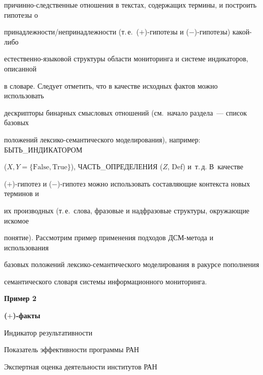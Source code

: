 причинно-следственные отношения в текстах, содержащих термины, и построить гипотезы о 


принадлежности/непринадлежности (т.\,е.\ ($+$)-ги\-по\-те\-зы и ($-$)-ги\-по\-те\-зы) ка\-кой-ли\-бо 


естественно-языковой структуры области мониторинга и системе индикаторов, описанной 


в словаре. Следует отметить, что в качестве исходных фактов можно использовать 


дескрипторы бинарных смысловых отношений (см.\ начало раздела~--- список базовых 


положений лек\-си\-ко-се\-ман\-ти\-че\-ско\-го моделирования), например: БЫТЬ\_ИНДИКАТОРОМ 


($X, Y=\mathrm{\{False, True\}}$), ЧАСТЬ\_ОПРЕДЕЛЕНИЯ ($Z$, Def) и~т.\,д. В~качестве 


($+$)-ги\-по\-тез и ($-$)-ги\-по\-тез можно использовать составляющие контекста новых терминов и 


их производных (т.\,е.\ слова, фразовые и надфразовые структуры, окружающие искомое 


понятие). Рассмотрим пример применения подходов ДСМ-ме\-то\-да и использования 


базовых положений лек\-си\-ко-се\-ман\-ти\-че\-ско\-го моделирования в ракурсе пополнения 


семантического словаря системы информационного мониторинга.


   


   \medskip


   


   \noindent


   \textbf{Пример 2}


   


   \smallskip


   \textbf{($+$)-факты}


   \smallskip


   


   Индикатор результативности


   


   Показатель эффективности программы РАН


   


   Экспертная оценка деятельности институтов РАН


